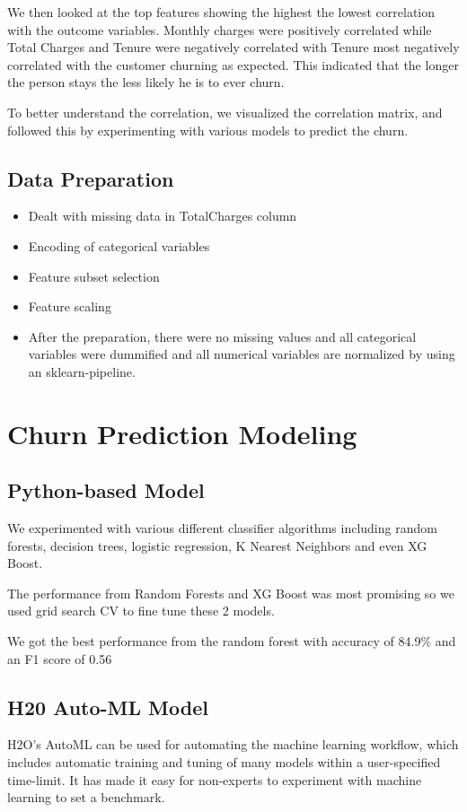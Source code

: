 \documentclass[12pt]{article}
\begin{document}
We then looked at the top features showing the highest the lowest correlation with the outcome variables. Monthly charges were positively  correlated while Total Charges and Tenure were negatively correlated with Tenure most negatively correlated with the customer churning as expected. This indicated that the longer the person stays the less likely he is to ever churn.

To better understand the correlation, we visualized the correlation matrix, and followed this by experimenting with various models to predict the churn.

\subsection{Data Preparation}
\begin{itemize}
	\item Dealt with missing data in TotalCharges column
	\item Encoding of categorical variables
	\item Feature subset selection
	\item Feature scaling
	\item  After the preparation, there were no missing values and all categorical variables were dummified and all numerical variables are normalized  by using an sklearn-pipeline.
\end{itemize}


\section{Churn Prediction Modeling} \label{sec:model}
\subsection{Python-based Model }

We experimented with various different classifier algorithms including random forests, decision trees, logistic regression, K Nearest Neighbors and even XG Boost.

The performance from Random Forests and XG Boost was most promising so we used grid search CV to fine tune these 2 models.

We got the best performance from the random forest with accuracy of 84.9\% and an F1 score of 0.56

\subsection{H20 Auto-ML Model}
H2O’s AutoML can be used for automating the machine learning workflow, which includes automatic training and tuning of many models within a user-specified time-limit. It has made it easy for non-experts to experiment with machine learning to set a benchmark. 
\end{document}
